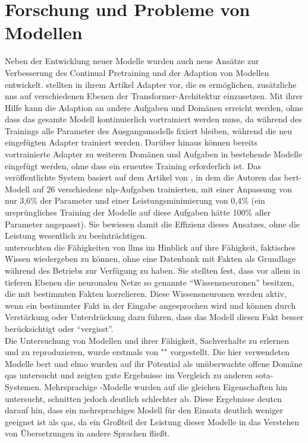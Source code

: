 \section{Forschung und Probleme von Modellen}
Neben der Entwicklung neuer Modelle wurden auch neue Ansätze zur Verbesserung des Continual Pretraining und der Adaption von Modellen entwickelt. 
\citet{adapterhub} stellten in ihrem Artikel Adapter vor, die es ermöglichen, zusätzliche \ac{nn}s auf verschiedenen Ebenen der Transformer-Architektur einzusetzen.
Mit ihrer Hilfe kann die Adaption an andere Aufgaben und Domänen erreicht werden, ohne dass das gesamte Modell kontinuierlich vortrainiert werden muss, da während des Trainings alle Parameter des Ausgangsmodells fixiert bleiben, während die neu eingefügten Adapter trainiert werden.
Darüber hinaus können bereits vortrainierte Adapter zu weiteren Domänen und Aufgaben in bestehende Modelle eingefügt werden, ohne dass ein erneutes Training erforderlich ist.
Das veröffentlichte System basiert auf dem Artikel von \citet{adapter_build_on}, in dem die Autoren das \ac{bert}-Modell auf 26 verschiedene \ac{nlp}-Aufgaben trainierten, mit einer Anpassung von nur 3,6\% der Parameter und einer Leistungsminimierung von 0,4\% (ein ursprüngliches Training der Modelle auf diese Aufgaben hätte 100\% aller Parameter angepasst). Sie bewiesen damit die Effizienz dieses Ansatzes, ohne die Leistung wesentlich zu beeinträchtigen.\\

\citet{knowledge_neurons} untersuchten die Fähigkeiten von \ac{llm}s im Hinblick auf ihre Fähigkeit, faktisches Wissen wiedergeben zu können, ohne eine Datenbank mit Fakten als Grundlage während des Betriebs zur Verfügung zu haben.
Sie stellten fest, dass vor allem in tieferen Ebenen die neuronalen Netze so genannte \enquote{Wissensneuronen} besitzen, die mit bestimmten Fakten korrelieren.
Diese Wissensneuronen werden aktiv, wenn ein bestimmter Fakt in der Eingabe angesprochen wird und können durch Verstärkung oder Unterdrückung dazu führen, dass das Modell diesen Fakt besser berücksichtigt oder \enquote{vergisst}.\\

Die Untersuchung von Modellen und ihrer Fähigkeit, Sachverhalte zu erlernen und zu reproduzieren, wurde erstmals von "\citet{knowledge_base}" vorgestellt.
Die hier verwendeten Modelle \ac{bert} und \ac{elmo} wurden auf ihr Potential als unüberwachte offene Domäne \ac{qas} untersucht und zeigten gute Ergebnisse im Vergleich zu anderen \ac{sota}-Systemen.
Mehrsprachige \citet{xfactr}-Modelle wurden auf die gleichen Eigenschaften hin untersucht, schnitten jedoch deutlich schlechter ab. Diese Ergebnisse deuten darauf hin, dass ein mehrsprachiges Modell für den Einsatz deutlich weniger geeignet ist als \ac{qas}, da ein Großteil der Leistung dieser Modelle in das Verstehen von Übersetzungen in andere Sprachen fließt.\\

